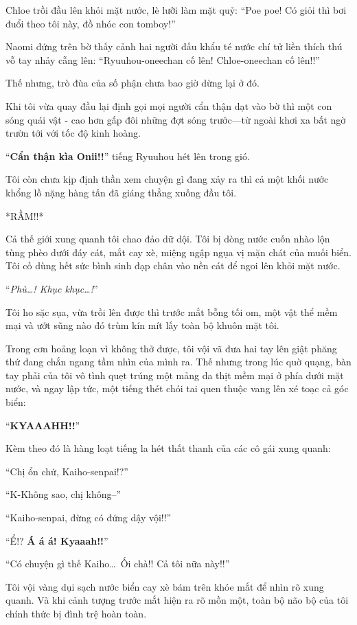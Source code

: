 \documentclass[../main.tex]{subfiles}
\begin{document}
Chloe trồi đầu lên khỏi mặt nước, lè lưỡi làm mặt quỷ: ``Poe poe! Có giỏi thì bơi đuổi theo tôi này, đồ nhóc con tomboy!''

Naomi đứng trên bờ thấy cảnh hai người đấu khẩu té nước chí tử liền thích thú vỗ tay nhảy cẫng lên: ``Ryuuhou-oneechan cố lên! Chloe-oneechan cố lên!!''

Thế nhưng, trò đùa của số phận chưa bao giờ dừng lại ở đó.

Khi tôi vừa quay đầu lại định gọi mọi người cẩn thận dạt vào bờ thì một con sóng quái vật - cao hơn gấp đôi những đợt sóng trước—từ ngoài khơi xa bất ngờ trườn tới với tốc độ kinh hoàng.

``\textbf{Cẩn thận kìa Onii!!}'' tiếng Ryuuhou hét lên trong gió.

Tôi còn chưa kịp định thần xem chuyện gì đang xảy ra thì cả một khối nước khổng lồ nặng hàng tấn đã giáng thẳng xuống đầu tôi.

*RẦM!!*

Cả thế giới xung quanh tôi chao đảo dữ dội. Tôi bị dòng nước cuốn nhào lộn tùng phèo dưới đáy cát, mắt cay xè, miệng ngập ngụa vị mặn chát của muối biển. Tôi cố dùng hết sức bình sinh đạp chân vào nền cát để ngoi lên khỏi mặt nước.

``\textit{Phù\dots! Khục khục\dots!}''

Tôi ho sặc sụa, vừa trồi lên được thì trước mắt bỗng tối om, một vật thể mềm mại và ướt sũng nào đó trùm kín mít lấy toàn bộ khuôn mặt tôi.

Trong cơn hoảng loạn vì không thở được, tôi vội vã đưa hai tay lên giật phăng thứ đang chắn ngang tầm nhìn của mình ra. Thế nhưng trong lúc quờ quạng, bàn tay phải của tôi vô tình quẹt trúng một mảng da thịt mềm mại ở phía dưới mặt nước, và ngay lập tức, một tiếng thét chói tai quen thuộc vang lên xé toạc cả góc biển:

``\textbf{KYAAAHH!!}''

Kèm theo đó là hàng loạt tiếng la hét thất thanh của các cô gái xung quanh:

``Chị ổn chứ, Kaiho-senpai!?''

``K-Không sao, chị không--''

``Kaiho-senpai, đừng có đứng dậy vội!!''

``Ể!? \textbf{Á á á! Kyaaah!!}''

``Có chuyện gì thế Kaiho\dots\ Ối chà!! Cả tôi nữa này!!''

Tôi vội vàng dụi sạch nước biển cay xè bám trên khóe mắt để nhìn rõ xung quanh. Và khi cảnh tượng trước mắt hiện ra rõ mồn một, toàn bộ não bộ của tôi chính thức bị đình trệ hoàn toàn.
\end{document}
